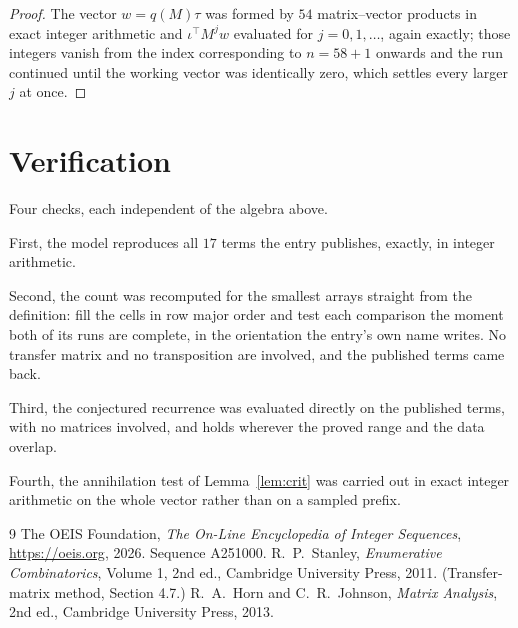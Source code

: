 \documentclass[11pt,a4paper]{article}
\theoremstyle{plain}
\theoremstyle{definition}
\begin{document}
\begin{proof}
The vector $w=q(M)\tau$ was formed by $54$ matrix--vector products in exact integer
arithmetic and $\iota^{\!\top}M^{j}w$ evaluated for $j=0,1,\dots$, again exactly; those
integers vanish from the index corresponding to $n=58+1$ onwards and the run continued
until the working vector was identically zero, which settles every larger $j$ at once.
\end{proof}

\section{Verification}

Four checks, each independent of the algebra above.

First, the model reproduces all $17$ terms the entry publishes, exactly, in integer
arithmetic.

Second, the count was recomputed for the smallest arrays straight from the definition: fill the
cells in row major order and test each comparison the moment both of its runs are complete,
in the orientation the entry's own name writes. No transfer matrix and no transposition are
involved, and the published terms came back.

Third, the conjectured recurrence was evaluated directly on the published terms, with no
matrices involved, and holds wherever the proved range and the data overlap.

Fourth, the annihilation test of Lemma~\ref{lem:crit} was carried out in exact integer
arithmetic on the whole vector rather than on a sampled prefix.

\begin{thebibliography}{9}
 The OEIS Foundation, \emph{The On-Line Encyclopedia of Integer
Sequences}, \url{https://oeis.org}, 2026. Sequence A251000.
 R.~P.~Stanley, \emph{Enumerative Combinatorics}, Volume 1, 2nd ed.,
Cambridge University Press, 2011. (Transfer-matrix method, Section 4.7.)
 R.~A.~Horn and C.~R.~Johnson, \emph{Matrix Analysis}, 2nd ed., Cambridge
University Press, 2013.
\end{thebibliography}
\end{document}
